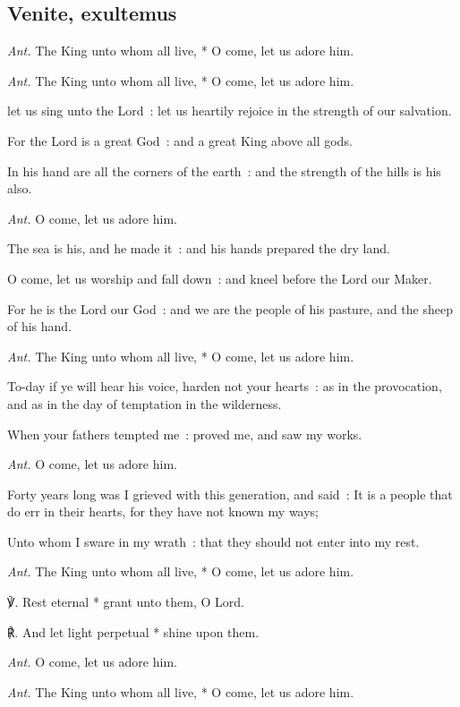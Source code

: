 \subsection{Venite, exultemus}\par\noindent
\textit{Ant.} The King unto whom all live, * O come, let us adore him.\par
\textit{Ant.} The King unto whom all live, * O come, let us adore him.\par
{} let us sing unto the Lord~: let us heartily rejoice in the strength of our salvation.\par
{}
For the Lord is a great God~: and a great King above all gods.\par
{}In his hand are all the corners of the earth~: and the strength of the hills is his also.\par
\textit{Ant.} O come, let us adore him.\par
{}The sea is his, and he made it~: and his hands prepared the dry land.\par
{}O come, let us worship and fall down~: and kneel before the Lord our Maker.\par
{}For he is the Lord our God~: and we are the people of his pasture, and the sheep of his hand.\par
\textit{Ant.} The King unto whom all live, * O come, let us adore him.\par
{}To-day if ye will hear his voice, harden not your hearts~: as in the provocation, and as in the day of temptation in the wilderness.\par
{}When your fathers tempted me~: proved me, and saw my works.\par
\textit{Ant.} O come, let us adore him.\par
{}Forty years long was I grieved with this generation, and said~: It is a people that do err in their hearts, for they have not known my ways;\par
{}Unto whom I sware in my wrath~: that they should not enter into my rest.\par
\textit{Ant.} The King unto whom all live, * O come, let us adore him.\par
℣. Rest eternal * grant unto them, O Lord.\par
℟. And let light perpetual * shine upon them.\par
\textit{Ant.} O come, let us adore him.\par\noindent
\textit{Ant.} The King unto whom all live, * O come, let us adore him.\par

